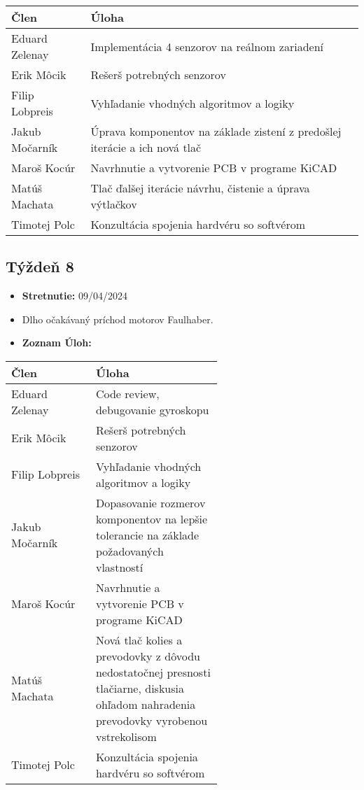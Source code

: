 \begin{tabular}{|l|l|}
    \hline
    \textbf{Člen} & \textbf{Úloha} \\
    \hline
    Eduard Zelenay & Implementácia 4 senzorov na reálnom zariadení \\
    Erik Môcik & Rešerš potrebných senzorov \\
    Filip Lobpreis & Vyhľadanie vhodných algoritmov a logiky \\
    Jakub Močarník & Úprava komponentov na základe zistení z predošlej iterácie a ich nová tlač \\
    Maroš Kocúr & Navrhnutie a vytvorenie PCB v programe KiCAD \\
    Matúš Machata & Tlač ďalšej iterácie návrhu, čistenie a úprava výtlačkov \\
    Timotej Polc & Konzultácia spojenia hardvéru so softvérom \\
    \hline
\end{tabular}
\subsection{Týždeň 8}
\begin{itemize}
    \item \textbf{Stretnutie:} 09/04/2024
    \item Dlho očakávaný príchod motorov Faulhaber.
    \item \textbf{Zoznam Úloh:}
\end{itemize}

\begin{table}[H]
    \centering
    \begin{tabular}{|l|p{0.6\linewidth}|}
        \hline
        \textbf{Člen} & \textbf{Úloha} \\
        \hline
        Eduard Zelenay & Code review, debugovanie gyroskopu \\
        Erik Môcik & Rešerš potrebných senzorov \\
        Filip Lobpreis & Vyhľadanie vhodných algoritmov a logiky \\
        Jakub Močarník & Dopasovanie rozmerov komponentov na lepšie tolerancie na základe požadovaných vlastností \\
        Maroš Kocúr & Navrhnutie a vytvorenie PCB v programe KiCAD \\
        Matúš Machata & Nová tlač kolies a prevodovky z dôvodu nedostatočnej presnosti tlačiarne, diskusia ohľadom nahradenia prevodovky vyrobenou vstrekolisom \\
        Timotej Polc & Konzultácia spojenia hardvéru so softvérom \\
        \hline
    \end{tabular}
\end{table}
